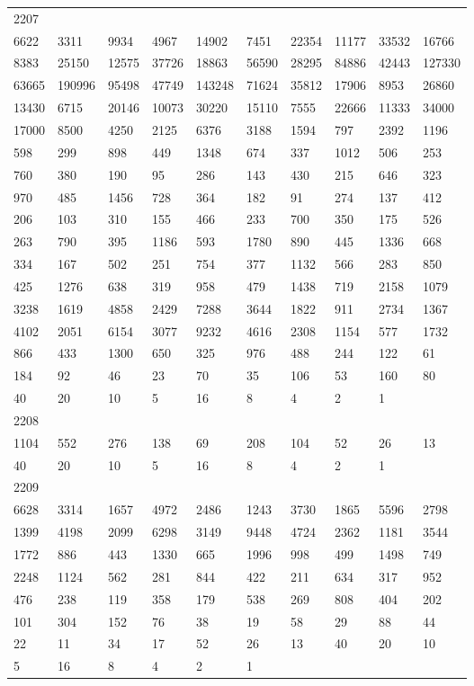\begin{longtable}{*{10}{l}}
2207&&&&&&&&&\\
6622& 3311& 9934& 4967& 14902& 7451& 22354& 11177& 33532& 16766\\
8383& 25150& 12575& 37726& 18863& 56590& 28295& 84886& 42443& 127330\\
63665& 190996& 95498& 47749& 143248& 71624& 35812& 17906& 8953& 26860\\
13430& 6715& 20146& 10073& 30220& 15110& 7555& 22666& 11333& 34000\\
17000& 8500& 4250& 2125& 6376& 3188& 1594& 797& 2392& 1196\\
598& 299& 898& 449& 1348& 674& 337& 1012& 506& 253\\
760& 380& 190& 95& 286& 143& 430& 215& 646& 323\\
970& 485& 1456& 728& 364& 182& 91& 274& 137& 412\\
206& 103& 310& 155& 466& 233& 700& 350& 175& 526\\
263& 790& 395& 1186& 593& 1780& 890& 445& 1336& 668\\
334& 167& 502& 251& 754& 377& 1132& 566& 283& 850\\
425& 1276& 638& 319& 958& 479& 1438& 719& 2158& 1079\\
3238& 1619& 4858& 2429& 7288& 3644& 1822& 911& 2734& 1367\\
4102& 2051& 6154& 3077& 9232& 4616& 2308& 1154& 577& 1732\\
866& 433& 1300& 650& 325& 976& 488& 244& 122& 61\\
184& 92& 46& 23& 70& 35& 106& 53& 160& 80\\
40& 20& 10& 5& 16& 8& 4& 2& 1& \\

2208&&&&&&&&&\\
1104& 552& 276& 138& 69& 208& 104& 52& 26& 13\\
40& 20& 10& 5& 16& 8& 4& 2& 1& \\

2209&&&&&&&&&\\
6628& 3314& 1657& 4972& 2486& 1243& 3730& 1865& 5596& 2798\\
1399& 4198& 2099& 6298& 3149& 9448& 4724& 2362& 1181& 3544\\
1772& 886& 443& 1330& 665& 1996& 998& 499& 1498& 749\\
2248& 1124& 562& 281& 844& 422& 211& 634& 317& 952\\
476& 238& 119& 358& 179& 538& 269& 808& 404& 202\\
101& 304& 152& 76& 38& 19& 58& 29& 88& 44\\
22& 11& 34& 17& 52& 26& 13& 40& 20& 10\\
5& 16& 8& 4& 2& 1& \\


\end{longtable}
